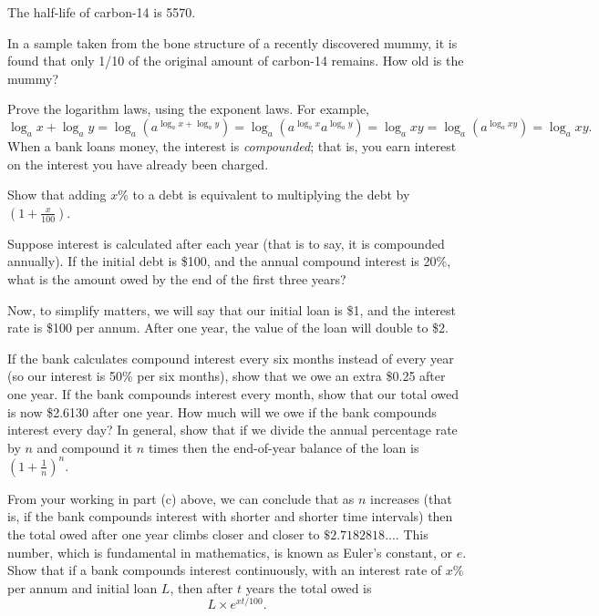 \begin{questions}
\begin{parts}
            The half-life of carbon-14 is \SI{5570}{\year}.

            In a sample taken from the bone structure of a recently discovered mummy, it is found that only 1/10 of the original
            amount of carbon-14 remains. How old is the mummy?
    \end{parts}
  \question Prove the logarithm laws, using the exponent laws. For example,
            \begin{displaymath}
              \log_a x + \log_a y = \log_a (a^{\log_a x + \log_a y}) = \log_a (a^{\log_a x}a^{\log_a y}) = \log_a xy = \log_ a (a^{\log_a xy}) = \log_a xy.
            \end{displaymath}
  \question When a bank loans money, the interest is \emph{compounded}; that is, you earn interest on the interest you have already
            been charged.
    \begin{parts}
      \item Show that adding $ x\% $ to a debt is equivalent to multiplying the debt by $ (1 + \frac{x}{100}) $.
      \item Suppose interest is calculated after each year (that is to say, it is compounded annually). If the initial
            debt is \$100, and the annual compound interest is 20\%, what is the amount owed by the end of the first three years?
      \item Now, to simplify matters, we will say that our initial loan is \$1, and the interest rate is \$100 per annum. After
            one year, the value of the loan will double to \$2.
        \begin{subparts}
          \subpart If the bank calculates compound interest every six months instead of every year (so our interest is 50\% per
                   six months), show that we owe an extra \$0.25 after one year.
          \subpart If the bank compounds interest every month, show that our total owed is now \$2.6130 after one year.
          \subpart How much will we owe if the bank compounds interest every day?
          \subpart In general, show that if we divide the annual percentage rate by $ n $ and compound it $ n $ times then the end-of-year
                   balance of the loan is $ (1 + \frac{1}{n})^n $.
        \end{subparts}
      \item From your working in part (c) above, we can conclude that as $ n $ increases (that is, if the bank compounds interest with shorter
            and shorter time intervals) then the total owed after one year climbs closer and closer to $ \$2.7182818... $. This number, which
            is fundamental in mathematics, is known as Euler's constant, or $ e $. Show that if a bank compounds interest continuously, with an
            interest rate of $ x\% $ per annum and initial loan $ L $, then after $ t $ years the total owed is
            \begin{displaymath}
              L \times e^{xt/100}.
            \end{displaymath}


\end{parts}
\end{questions}
